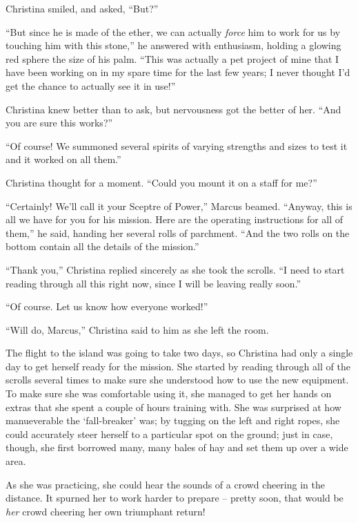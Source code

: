 \documentclass[showtrims,b6paper,draft,10pt]{memoir}
\begin{document}
Christina smiled, and asked, ``But?''

``But since he is made of the ether, we can actually \emph{force} him to work for us by touching him with this stone,'' he answered with enthusiasm, holding a glowing red sphere the size of his palm.  ``This was actually a pet project of mine that I have been working on in my spare time for the last few years;  I never thought I'd get the chance to actually see it in use!''

Christina knew better than to ask, but nervousness got the better of her.  ``And you are sure this works?''

``Of course!  We summoned several spirits of varying strengths and sizes to test it and it worked on all them.''

Christina thought for a moment.  ``Could you mount it on a staff for me?''

``Certainly!  We'll call it your Sceptre of Power,''  Marcus beamed.  ``Anyway, this is all we have for you for his mission.  Here are the operating instructions for all of them,'' he said, handing her several rolls of parchment.  ``And the two rolls on the bottom contain all the details of the mission.''

``Thank you,'' Christina replied sincerely as she took the scrolls.  ``I need to start reading through all this right now, since I will be leaving really soon.''

``Of course.  Let us know how everyone worked!''

``Will do, Marcus,''  Christina said to him as she left the room.

\timeskip


The flight to the island was going to take two days, so Christina had only a single day to get herself ready for the mission.  She started by reading through all of the scrolls several times to make sure she understood how to use the new equipment.  To make sure she was comfortable using it, she managed to get her hands on extras that she spent a couple of hours training with.  She was surprised at how manueverable the `fall-breaker' was;  by tugging on the left and right ropes, she could accurately steer herself to a particular spot on the ground;  just in case, though, she first borrowed many, many bales of hay and set them up over a wide area.

As she was practicing, she could hear the sounds of a crowd cheering in the distance.  It spurned her to work harder to prepare -- pretty soon, that would be \emph{her} crowd cheering her own triumphant return!
\end{document}
